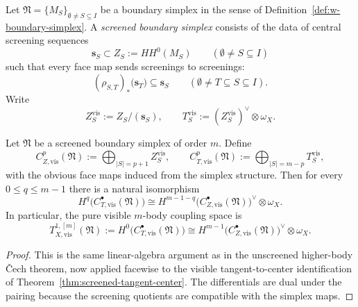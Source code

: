 \begin{definition}
Let $\mathfrak N=\{M_S\}_{\emptyset\neq S\subseteq I}$ be a boundary simplex in the sense of
Definition~\ref{def:w-boundary-simplex}.
A \emph{screened boundary simplex} consists of the data of central screening sequences
\[
\mathbf s_S\subset Z_S:=HH^0(M_S)
\qquad (\emptyset\neq S\subseteq I)
\]
such that every face map sends screenings to screenings:
\[
(\rho_{S,T})_*\bigl(\mathbf s_T\bigr)\subseteq \mathbf s_S
\qquad (\emptyset\neq T\subseteq S\subseteq I).
\]
Write
\[
Z_S^{\mathrm{vis}}:=Z_S/(\mathbf s_S),
\qquad
T_S^{\mathrm{vis}}:=(Z_S^{\mathrm{vis}})^{\vee}\otimes \omega_X.
\]
\end{definition}

\begin{theorem}
Let $\mathfrak N$ be a screened boundary simplex of order $m$.
Define
\[
C_{Z,\mathrm{vis}}^p(\mathfrak N):=\bigoplus_{|S|=p+1} Z_S^{\mathrm{vis}},
\qquad
C_{T,\mathrm{vis}}^p(\mathfrak N):=\bigoplus_{|S|=m-p} T_S^{\mathrm{vis}},
\]
with the obvious face maps induced from the simplex structure.
Then for every $0\le q\le m-1$ there is a natural isomorphism
\[
H^q\bigl(C_{T,\mathrm{vis}}^{\bullet}(\mathfrak N)\bigr)
\cong
H^{m-1-q}\bigl(C_{Z,\mathrm{vis}}^{\bullet}(\mathfrak N)\bigr)^{\vee}\otimes \omega_X.
\]
In particular, the pure visible $m$-body coupling space is
\[
T_{X,\mathrm{vis}}^{1,[m]}(\mathfrak N)
:=H^0\bigl(C_{T,\mathrm{vis}}^{\bullet}(\mathfrak N)\bigr)
\cong
H^{m-1}\bigl(C_{Z,\mathrm{vis}}^{\bullet}(\mathfrak N)\bigr)^{\vee}\otimes \omega_X.
\]
\end{theorem}

\begin{proof}
This is the same linear-algebra argument as in the unscreened higher-body \v{C}ech theorem, now applied
facewise to the visible tangent-to-center identification of Theorem~\ref{thm:screened-tangent-center}.
The differentials are dual under the pairing because the screening quotients are compatible with the simplex maps.
\end{proof}

